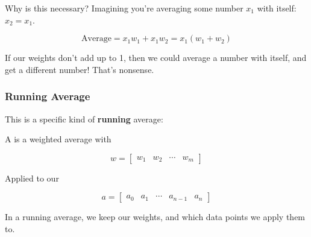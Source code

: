             Why is this necessary? Imagining you're averaging some number $x_1$ with itself: $x_2=x_1$. 
            
            \begin{equation}
                \text{Average} = x_1w_1+x_1w_2 = x_1(w_1+w_2)
            \end{equation}
            
            If our weights don't add up to 1, then we could average a number with itself, and get a different number! That's nonsense.
            
            \subsecdiv
            
            
            
            
            \subsubsection{Running Average}
            
            This is a specific kind of \textbf{running} average:\\
        
            \begin{definition}
                A  is a weighted average with 
                
                \begin{equation}
                    w =
                    \begin{bmatrix}
                        w_1 & w_2 & \cdots & w_m
                    \end{bmatrix}
                \end{equation}
                
                Applied to our 
                
                \begin{equation*}
                        a 
                    = 
                    \begin{bmatrix}
                        a_0 & a_1 & \cdots & a_{n-1} & a_n
                    \end{bmatrix}
                \end{equation*}
                
                In a running average, we keep our weights, and  which data points we apply them to.
            \end{definition}
            
